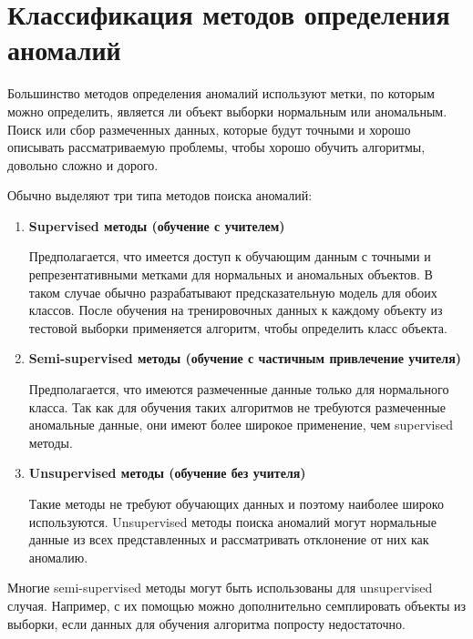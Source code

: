 \section{Классификация методов определения аномалий} \label{sec:ch1/sec3}

Большинство методов определения аномалий используют метки, по которым можно определить, является ли объект выборки нормальным или аномальным. Поиск или сбор размеченных данных, которые будут точными и хорошо описывать рассматриваемую проблемы, чтобы хорошо обучить алгоритмы, довольно сложно и дорого.

\noindent Обычно выделяют три типа методов поиска аномалий:

\begin{enumerate}
	\item \textbf{Supervised методы (обучение с учителем)}

Предполагается, что имеется доступ к обучающим данным с точными и репрезентативными метками для нормальных и аномальных объектов. В таком случае обычно разрабатывают предсказательную модель для обоих классов. После обучения на тренировочных данных к каждому объекту из тестовой выборки применяется алгоритм, чтобы определить класс объекта. 
	
	\item \textbf{Semi-supervised методы (обучение с частичным привлечение учителя)}

Предполагается, что имеются размеченные данные только для нормального класса. Так как для обучения таких алгоритмов не требуются размеченные аномальные данные, они имеют более широкое применение, чем supervised методы.
	\item \textbf{Unsupervised методы (обучение без учителя)}

Такие методы не требуют обучающих данных и поэтому наиболее широко используются. Unsupervised методы поиска аномалий могут нормальные данные из всех представленных и рассматривать отклонение от них как аномалию.
\end{enumerate}
Многие semi-supervised методы могут быть использованы для unsupervised случая. Например, с их помощью можно дополнительно семплировать объекты из выборки, если данных для обучения алгоритма попросту недостаточно.

